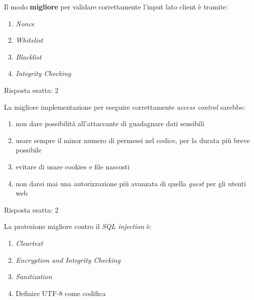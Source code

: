 \begin{Exercise} [
  title={Quiz},
  label={esControlli5}
  ]

  \Question Il modo \textbf{migliore} per validare correttamente l'input lato
client è tramite:
  \begin{enumerate}
\item \textit{Nonce}
\item \textit{Whitelist}
\item \textit{Blacklist}
\item \textit{Integrity Checking}
\end{enumerate}


\end{Exercise}

\begin{Answer} [
  ref={esControlli5},
  number={5}
  ]

  \Question Risposta esatta: 2
\end{Answer}


\begin{Exercise} [
  title={Quiz},
  label={esControlli6}
  ]

  \Question La migliore implementazione per eseguire correttamente
\textit{access control} sarebbe:
\begin{enumerate}
 \item non dare possibilità all'attaccante di guadagnare dati sensibili
 \item usare sempre il minor numero di permessi nel codice, per la durata più
breve possibile
 \item evitare di usare cookies e file nascosti
 \item non darei mai una autorizzazione più avanzata di quella \textit{guest}
per gli utenti web
\end{enumerate}

\end{Exercise}

\begin{Answer} [
  ref={esControlli6},
  number={6}
  ]

  \Question Risposta esatta: 2
\end{Answer}


\begin{Exercise} [
  title={Quiz},
  label={esControlli7}
  ]

  \Question La protezione migliore contro il \textit{SQL injection} è:
  \begin{enumerate}
    \item \textit{Cleartext}
    \item \textit{Encryption and Integrity Checking}
    \item \textit{Sanitization}
    \item Definire UTF-8 come codifica
  \end{enumerate}
\end{Exercise}

